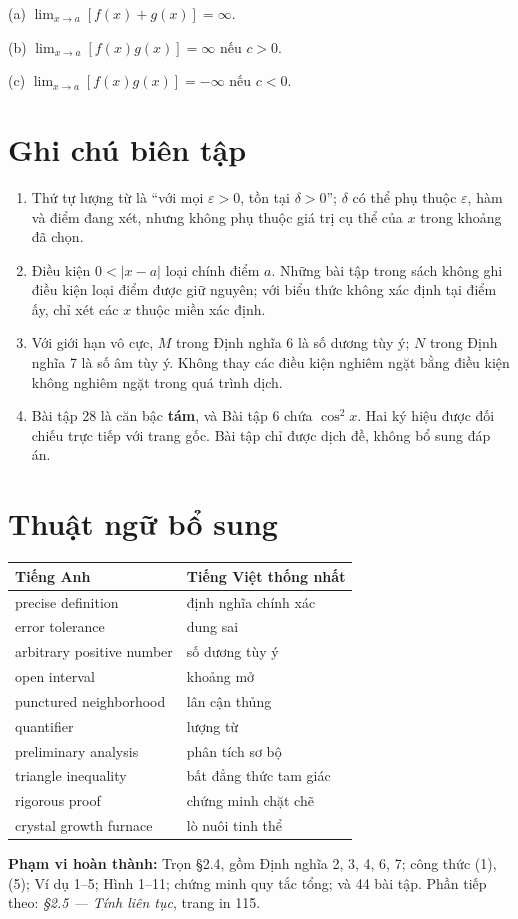 \documentclass[12pt,a4paper]{article}
\begin{document}
(a) $\lim_{x\to a}[f(x)+g(x)]=\infty$.

(b) $\lim_{x\to a}[f(x)g(x)]=\infty$ nếu $c>0$.

(c) $\lim_{x\to a}[f(x)g(x)]=-\infty$ nếu $c<0$.
\section*{Ghi chú biên tập}
\begin{enumerate}
\item Thứ tự lượng từ là ``với mọi $\varepsilon>0$, tồn tại $\delta>0$''; $\delta$ có thể phụ thuộc $\varepsilon$, hàm và điểm đang xét, nhưng không phụ thuộc giá trị cụ thể của $x$ trong khoảng đã chọn.
\item Điều kiện $0<|x-a|$ loại chính điểm $a$. Những bài tập trong sách không ghi điều kiện loại điểm được giữ nguyên; với biểu thức không xác định tại điểm ấy, chỉ xét các $x$ thuộc miền xác định.
\item Với giới hạn vô cực, $M$ trong Định nghĩa 6 là số dương tùy ý; $N$ trong Định nghĩa 7 là số âm tùy ý. Không thay các điều kiện nghiêm ngặt bằng điều kiện không nghiêm ngặt trong quá trình dịch.
\item Bài tập 28 là căn bậc \textbf{tám}, và Bài tập 6 chứa $\cos^2x$. Hai ký hiệu được đối chiếu trực tiếp với trang gốc. Bài tập chỉ được dịch đề, không bổ sung đáp án.
\end{enumerate}
\section*{Thuật ngữ bổ sung}
\begin{center}\begin{tabular}{ll}\toprule Tiếng Anh&Tiếng Việt thống nhất\\\midrule
precise definition&định nghĩa chính xác\\
error tolerance&dung sai\\
arbitrary positive number&số dương tùy ý\\
open interval&khoảng mở\\
punctured neighborhood&lân cận thủng\\
quantifier&lượng từ\\
preliminary analysis&phân tích sơ bộ\\
triangle inequality&bất đẳng thức tam giác\\
rigorous proof&chứng minh chặt chẽ\\
crystal growth furnace&lò nuôi tinh thể\\
\bottomrule\end{tabular}\end{center}
\noindent\textbf{Phạm vi hoàn thành:} Trọn §2.4, gồm Định nghĩa 2, 3, 4, 6, 7; công thức (1), (5); Ví dụ 1–5; Hình 1–11; chứng minh quy tắc tổng; và 44 bài tập. Phần tiếp theo: \textit{§2.5 — Tính liên tục}, trang in 115.
\end{document}

